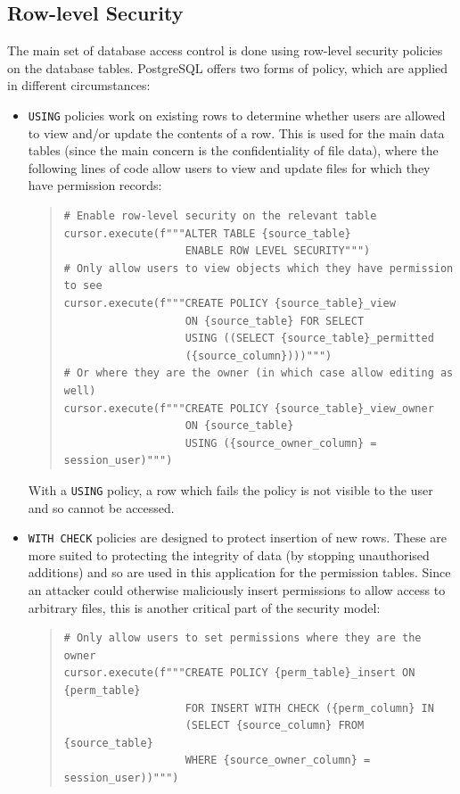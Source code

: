 \documentclass[12pt]{report}
\begin{document}
\subsection{Row-level Security}
The main set of database access control is done using row-level security policies on the database tables. PostgreSQL offers two forms of policy, which are applied in different circumstances\cite{postgres-policy}:
\begin{itemize}
\item
  \texttt{USING} policies work on existing rows to determine whether users are allowed to view and/or update the contents of a row. This is used for the main data tables (since the main concern is the confidentiality of file data), where the following lines of code allow users to view and update files for which they have permission records:

\begin{quote}
\begin{verbatim}
# Enable row-level security on the relevant table
cursor.execute(f"""ALTER TABLE {source_table}
                   ENABLE ROW LEVEL SECURITY""")
# Only allow users to view objects which they have permission to see
cursor.execute(f"""CREATE POLICY {source_table}_view
                   ON {source_table} FOR SELECT
                   USING ((SELECT {source_table}_permitted
                   ({source_column})))""")
# Or where they are the owner (in which case allow editing as well)
cursor.execute(f"""CREATE POLICY {source_table}_view_owner
                   ON {source_table}
                   USING ({source_owner_column} = session_user)""")
\end{verbatim}
\end{quote}

  With a \texttt{USING} policy, a row which fails the policy is not visible to the user and so cannot be accessed.

\item
  \texttt{WITH CHECK} policies are designed to protect insertion of new rows. These are more suited to protecting the integrity of data (by stopping unauthorised additions) and so are used in this application for the permission tables. Since an attacker could otherwise maliciously insert permissions to allow access to arbitrary files, this is another critical part of the security model:

\begin{quote}
\begin{verbatim}
# Only allow users to set permissions where they are the owner
cursor.execute(f"""CREATE POLICY {perm_table}_insert ON {perm_table}
                   FOR INSERT WITH CHECK ({perm_column} IN
                   (SELECT {source_column} FROM {source_table}
                   WHERE {source_owner_column} = session_user))""")
\end{verbatim}
\end{quote}
\end{itemize}
\end{document}
